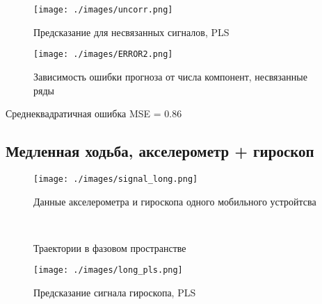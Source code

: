 \documentclass[12pt]{extarticle}
\begin{document}
\begin{figure}[h!]
\centering
{\texttt{[image: ./images/uncorr.png]}}
\caption{Предсказание для несвязанных сигналов, PLS}
\label{fg:signal}
\end{figure}

\begin{figure}[h!]
\centering
{\texttt{[image: ./images/ERROR2.png]}}
\caption{Зависимость ошибки прогноза от числа компонент, несвязанные ряды}
\label{fg:signal}
\end{figure}

Среднеквадратичная ошибка MSE = 0.86

\subsection{Медленная ходьба, акселерометр + гироскоп}

\begin{figure}[h!]
\centering
{\texttt{[image: ./images/signal\_long.png]}}
\caption{Данные акселерометра и гироскопа одного мобильного устройтсва}
\label{fg:signal}
\end{figure}

\begin{figure}[h!]
\centering
  \\
\caption{Траектории в фазовом пространстве}
\label{fg:initial_traj}
\end{figure}

\begin{figure}[h!]
\centering
{\texttt{[image: ./images/long\_pls.png]}}
\caption{Предсказание сигнала гироскопа, PLS}
\label{fg:signal}
\end{figure}

\newpage



% 
% 
\end{document}

